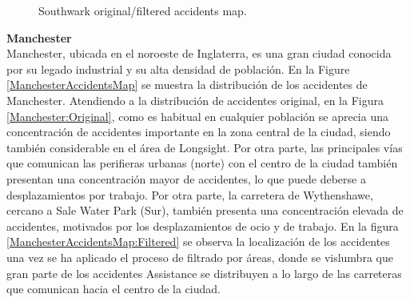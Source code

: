 \documentclass{uathesis-es}
\begin{document}
{\begin{figure}[H]
{         \label{SouthwarkAccidentsMap:Filtered}
     }
     \caption{Southwark original/filtered accidents map.}
     \label{SouthwarkAccidentsMap}
 \end{figure}


\textbf{Manchester}\\

Manchester, ubicada en el noroeste de Inglaterra, es una gran ciudad conocida por su legado industrial y su alta densidad de población. En la Figure \ref{ManchesterAccidentsMap} se muestra la distribución de los accidentes de Manchester. Atendiendo a la distribución de accidentes original, en la Figura \ref{Manchester:Original}, como es habitual en cualquier población se aprecia una concentración de accidentes importante en la zona central de la ciudad, siendo también considerable en el área de Longsight. Por otra parte, las principales vías que comunican las perifieras urbanas (norte) con el centro de la ciudad también presentan una concentración mayor de accidentes, lo que puede deberse a desplazamientos por trabajo. Por otra parte, la carretera de Wythenshawe, cercano a Sale Water Park (Sur), también presenta una concentración elevada de accidentes, motivados por los desplazamientos de ocio y de trabajo. En la figura \ref{ManchesterAccidentsMap:Filtered} se observa la localización de los accidentes una vez se ha aplicado el proceso de filtrado por áreas, donde se vislumbra que gran parte de los accidentes Assistance se distribuyen a lo largo de las carreteras que comunican hacia el centro de la ciudad.


}
\end{document}
